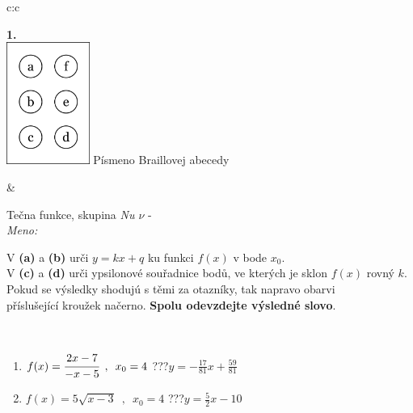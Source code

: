\documentclass[10pt]{report}
\begin{document}
\begin{tabular}{c:c}
\begin{minipage}[c][104.5mm][t]{0.5\linewidth}
\begin{center}
\begin{minipage}{0.20\linewidth}
\begin{center}
{\Huge\bfseries 1.} \\[2mm]
\includegraphics[height=40mm]{../images/braille.png}
{\small Písmeno Braillovej abecedy}
\end{center}
\end{minipage}
\end{center}
\end{minipage}
&
\begin{minipage}[c][104.5mm][t]{0.5\linewidth}
\begin{center}
\vspace{7mm}
{\huge Tečna funkce, skupina \textit{Nu $\nu$} -}\\[5mm]
\textit{Meno:}\phantom{xxxxxxxxxxxxxxxxxxxxxxxxxxxxxxxxxxxxxxxxxxxxxxxxxxxxxxxxxxxxxxxxx}\\[5mm]
\begin{minipage}{0.95\linewidth}
\begin{center}
V \textbf{(a)} a \textbf{(b)} urči  $y = kx + q$ ku funkci $f(x)$ v bode $x_0$.\\V \textbf{(c)} a \textbf{(d)} urči ypsilonové souřadnice bodů, ve kterých je sklon $f(x)$ rovný $k$.\\Pokud se výsledky shodujú s těmi za otazníky, tak napravo obarvi\\příslušející kroužek načerno. \textbf{Spolu odevzdejte výsledné slovo}.
\end{center}
\end{minipage}
\\[1mm]
\begin{minipage}{0.79\linewidth}
\begin{center}
\begin{varwidth}{\linewidth}
\begin{enumerate}
\small
\item $f(x)=\cfrac{2x-7}{-x-5}\enspace , \enspace x_0=4$\quad \dotfill\; ???\;\dotfill \quad $y = -\frac{17}{81}x+\frac{59}{81}$
\item $f(x)=5\sqrt{x-3}\enspace , \enspace x_0=4$\quad \dotfill\; ???\;\dotfill \quad $y = \frac{5}{2}x-10$

\end{enumerate}
\end{varwidth}
\end{center}
\end{minipage}
\end{center}
\end{minipage}
\end{tabular}
\end{document}

